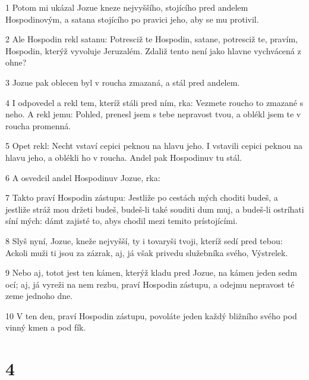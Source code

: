 \par 1 Potom mi ukázal Jozue kneze nejvyššího, stojícího pred andelem Hospodinovým, a satana stojícího po pravici jeho, aby se mu protivil.
\par 2 Ale Hospodin rekl satanu: Potresciž te Hospodin, satane, potresciž te, pravím, Hospodin, kterýž vyvoluje Jeruzalém. Zdaliž tento není jako hlavne vychvácená z ohne?
\par 3 Jozue pak oblecen byl v roucha zmazaná, a stál pred andelem.
\par 4 I odpovedel a rekl tem, kteríž stáli pred ním, rka: Vezmete roucho to zmazané s neho. A rekl jemu: Pohled, prenesl jsem s tebe nepravost tvou, a oblékl jsem te v roucha promenná.
\par 5 Opet rekl: Necht vstaví cepici peknou na hlavu jeho. I vstavili cepici peknou na hlavu jeho, a oblékli ho v roucha. Andel pak Hospodinuv tu stál.
\par 6 A osvedcil andel Hospodinuv Jozue, rka:
\par 7 Takto praví Hospodin zástupu: Jestliže po cestách mých choditi budeš, a jestliže stráž mou držeti budeš, budeš-li také souditi dum muj, a budeš-li ostríhati síní mých: dámt zajisté to, abys chodil mezi temito prístojícími.
\par 8 Slyš nyní, Jozue, kneže nejvyšší, ty i tovaryši tvoji, kteríž sedí pred tebou: Ackoli muži ti jsou za zázrak, aj, já však privedu služebníka svého, Výstrelek.
\par 9 Nebo aj, totot jest ten kámen, kterýž kladu pred Jozue, na kámen jeden sedm ocí; aj, já vyreži na nem rezbu, praví Hospodin zástupu, a odejmu nepravost té zeme jednoho dne.
\par 10 V ten den, praví Hospodin zástupu, povoláte jeden každý bližního svého pod vinný kmen a pod fík.

\chapter{4}

